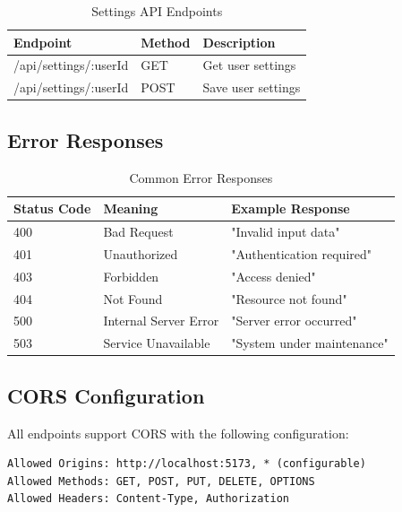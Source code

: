 \documentclass[12pt,a4paper]{article}
\begin{document}
    \begin{table}[H]
        \caption{Settings API Endpoints}
        \begin{tabular}{|l|l|p{5cm}|}
            \hline
            \textbf{Endpoint} & \textbf{Method} & \textbf{Description} \\
            \hline
            /api/settings/:userId & GET & Get user settings \\
            \hline
            /api/settings/:userId & POST & Save user settings \\
            \hline
        \end{tabular}
    \end{table}

    \subsection{Error Responses}

    \begin{table}[H]
        \caption{Common Error Responses}
        \begin{tabular}{|l|l|p{5cm}|}
            \hline
            \textbf{Status Code} & \textbf{Meaning} & \textbf{Example Response} \\
            \hline
            400 & Bad Request & "Invalid input data" \\
            \hline
            401 & Unauthorized & "Authentication required" \\
            \hline
            403 & Forbidden & "Access denied" \\
            \hline
            404 & Not Found & "Resource not found" \\
            \hline
            500 & Internal Server Error & "Server error occurred" \\
            \hline
            503 & Service Unavailable & "System under maintenance" \\
            \hline
        \end{tabular}
    \end{table}

    \subsection{CORS Configuration}

    All endpoints support CORS with the following configuration:

    \begin{verbatim}
Allowed Origins: http://localhost:5173, * (configurable)
Allowed Methods: GET, POST, PUT, DELETE, OPTIONS
Allowed Headers: Content-Type, Authorization
    \end{verbatim}
\end{document}
